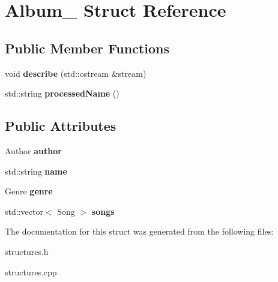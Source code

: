 \hypertarget{struct_album__}{}\section{Album\+\_\+ Struct Reference}
\label{struct_album__}
\subsection*{Public Member Functions}
\begin{DoxyCompactItemize}
\item 
void {\bfseries describe} (std\+::ostream \&stream)\hypertarget{struct_album___a9cdd04dd67fd6bb92c7fb44d42f89757}{}\label{struct_album___a9cdd04dd67fd6bb92c7fb44d42f89757}

\item 
std\+::string {\bfseries processed\+Name} ()\hypertarget{struct_album___a946bb4b842ab1aedc5f9b9bc9bcc0062}{}\label{struct_album___a946bb4b842ab1aedc5f9b9bc9bcc0062}

\end{DoxyCompactItemize}
\subsection*{Public Attributes}
\begin{DoxyCompactItemize}
\item 
Author {\bfseries author}\hypertarget{struct_album___af3e97c0f2ecf8caaba18e71f9874045d}{}\label{struct_album___af3e97c0f2ecf8caaba18e71f9874045d}

\item 
std\+::string {\bfseries name}\hypertarget{struct_album___a54fb17714304e3d6fa86f89130b5d9c8}{}\label{struct_album___a54fb17714304e3d6fa86f89130b5d9c8}

\item 
Genre {\bfseries genre}\hypertarget{struct_album___af0d85b7e14bd7fe0f123fd7ead88e4e6}{}\label{struct_album___af0d85b7e14bd7fe0f123fd7ead88e4e6}

\item 
std\+::vector$<$ Song $>$ {\bfseries songs}\hypertarget{struct_album___a759d1d5becffd11e034ee02f0fe1c8b4}{}\label{struct_album___a759d1d5becffd11e034ee02f0fe1c8b4}

\end{DoxyCompactItemize}


The documentation for this struct was generated from the following files\+:\begin{DoxyCompactItemize}
\item 
structures.\+h\item 
structures.\+cpp\end{DoxyCompactItemize}
